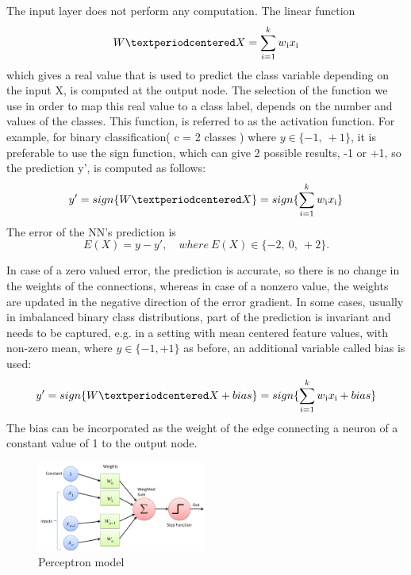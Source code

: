     The input layer does not perform any computation. The linear function \begin{equation}
        W · X = \sum_{i=1}^{k} w\textsubscript{i} x\textsubscript{i} \label{eq:XY}
    \end{equation}
    which gives a real value that is used to predict the class variable depending on the input X, is computed at the output node. The selection of the function we use in order to map this real value to a class label, depends on the number and values of the classes. This function, is referred to as the activation function.
    For example, for binary classification( c = 2 classes ) where $y\in \{-1,\ +1\}$, it is preferable to use the sign function, which can give 2 possible results, -1 or +1, so the prediction y', is computed as follows: 
    \begin{equation}
        y' = sign\{ W · X\} = sign \{  \sum_{i=1}^{k} w\textsubscript{i} x\textsubscript{i} \} 
    \end{equation}  
    The error of the NN's prediction is 
    \begin{equation}
        E(X) = y - y', \quad where \ E(X) \in \{-2,\ 0,\ +2 \}.
    \end{equation}
    
    In case of a zero valued error, the prediction is accurate, so there is no change in the weights of the connections, whereas in case of a nonzero value, the weights are updated in the negative direction of the error gradient.
    In some cases, usually in imbalanced binary class distributions, part of the prediction is invariant and needs to be captured, e.g. in a setting with mean centered feature values, with non-zero mean, where $y \in \{ -1, +1 \}$ as before, an additional variable called bias is used: 
    \begin{equation}
        y' = sign\{ W · X + bias\} = sign \{  \sum_{i=1}^{k} w\textsubscript{i} x\textsubscript{i} + bias \}
    \end{equation}
    The bias can be incorporated as the weight of the edge connecting a neuron of a constant value of 1 to the output node.
    
   \begin{figure}[h]
        \centering
        \includegraphics[width=0.50\textwidth]{media/perceptron.png}
        \caption{Perceptron model}
        \label{fig:perceptron}
    \end{figure}

